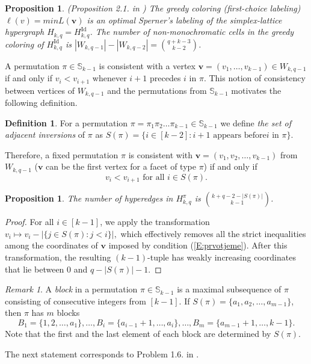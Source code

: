 \documentclass{birkjour}
\newtheorem{prop}[thm]{Proposition}
\theoremstyle{definition}
\newtheorem{defn}[thm]{Definition}
\theoremstyle{remark}
\newtheorem{rem}[thm]{Remark}
\numberwithin{equation}{section}
\begin{document}
\begin{prop}\label{greedy} (Proposition 2.1. in \cite{M-V})
The greedy coloring (first-choice labeling) $\ell(v)=min
L(\mathbf{v})$ is an optimal Sperner's labeling of the
simplex-lattice hypergraph $H_{k,q}=H_{k,q}^{\mathrm{Id}}$. The
number of non-monochromatic cells in the greedy coloring of
$H_{k,q}^{\mathrm{Id}}$ is $|W_{k,q-1}|-|W_{k,q-2}|={q+k-3\choose
k-2}$.
\end{prop}
 A permutation $\pi\in \mathbb{S}_{k-1}$ is consistent
with a vertex $\mathbf{v}=(v_1,\ldots,v_{k-1})\in W_{k,q-1}$ if
and only if $v_i<v_{i+1}$ whenever $i+1$ precedes $i$ in $\pi$.
This notion of consistency between vertices of $W_{k,q-1}$ and the
permutations from $\mathbb{S}_{k-1}$ motivates the following
definition.
\begin{defn}
  For a permutation $\pi=\pi_1\pi_2\ldots\pi_{k-1}\in
\mathbb{S}_{k-1}$ we define \emph{the set of adjacent inversions}
of $\pi$ as $S(\pi)=\big\{i\in[k-2]:i+1 \textrm{ appears before
}i\textrm{ in }\pi\big\}.$
\end{defn} Therefore, a fixed permutation $\pi$ is consistent with
$\mathbf{v}=(v_1,v_2,\ldots,v_{k-1})$ from $W_{k,q-1}$
($\mathbf{v}$ can be the first vertex for a facet of type $\pi$)
if and only if
\begin{equation}\label{E:prvotjeme}
v_i< v_{i+1}\textrm{ for all }i \in S(\pi).
\end{equation}

\begin{prop}\label{P:numberofhyperedges} The number of
hyperedges in $H^\pi_{k,q}$ is ${k+q-2-|S(\pi)|\choose k-1}$.
\end{prop}
\begin{proof}
 For all
$i\in [k-1]$, we apply the transformation $v_i\mapsto v_i-|\{j\in
S(\pi):j<i\}|,$ which effectively removes all the strict
inequalities among the coordinates of $\mathbf{v}$ imposed by
condition (\ref{E:prvotjeme}). After this transformation, the
resulting $(k-1)$-tuple has weakly increasing coordinates that lie
between $0$ and $q-|S(\pi)|-1$.
\end{proof}
\begin{rem}\label{R:blocksinpi} A \textit{block} in a
permutation $\pi\in\mathbb{S}_{k-1}$
is a maximal subsequence of $\pi$ consisting of consecutive
integers from $[k-1]$. If $S(\pi)=\{a_1,a_2,\ldots,a_{m-1}\}$,
then
 $\pi$ has $m$ blocks
$$B_1=\{1,2,\ldots,a_1\},\ldots,
B_{i}=\{a_{i-1}+1 ,\ldots,a_i\},\ldots, B_{m}=\{a_{m-1}+1
,\ldots,k-1\}.$$ Note that the first and the last element of each
block are determined by $S(\pi)$.
\end{rem}
The next statement corresponds to Problem 1.6. in \cite{Pet}.
\end{document}
